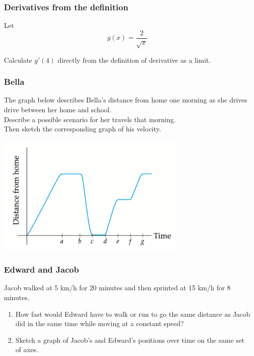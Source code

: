 \begin{frame}[t]
	\frametitle{Derivatives from the definition}

	Let
	\[
		g(x) = \frac{2}{\sqrt{x}}
	\]

	Calculate $\displaystyle g'(4)$ directly from the definition of derivative as a
	limit.
\end{frame}

\begin{frame}
	\frametitle{Bella}

	The graph below describes Bella's distance from home one morning as she drives
	drive between her home and school.\\

	Describe a possible scenario for her travels that morning. \\ Then sketch the
	corresponding graph of his velocity.

	\begin{center}
		\includegraphics[width=0.7\textwidth]{G9}
	\end{center}
\end{frame}

\begin{frame}
	\frametitle{Edward and Jacob}

	Jacob walked at 5 km/h for 20 minutes and then sprinted at 15 km/h for 8
	minutes.
	\begin{enumerate}
		\item How fast would Edward have to walk or run to go the same distance as Jacob
			did in the same time while moving at a constant speed?

		\item Sketch a graph of Jacob's and Edward's positions over time on the same
			set of axes.
	\end{enumerate}
\end{frame}

